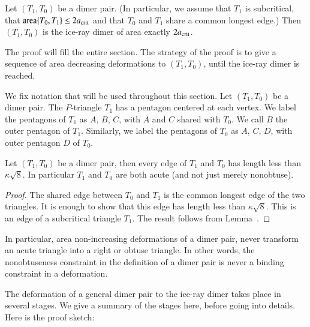 \begin{theorem}
  Let $(T_1,T_0)$ be a dimer pair.  (In particular, we assume that
  $T_1$ is subcritical, that ${\operatorname{area}}\{T_0,T_1\}\le 2a_\text{crit}$ and that
  $T_0$ and $T_1$ share a common longest edge.)  Then $(T_1,T_0)$ is
  the ice-ray dimer of area exactly $2a_\text{crit}$.
\end{theorem}

The proof will fill the entire section.  The strategy of the proof is
to give a sequence of area decreasing deformations to $(T_1,T_0)$,
until the ice-ray dimer is reached.

We fix notation that will be used throughout this section. Let
$(T_1,T_0)$ be a dimer pair.  The $P$-triangle $T_1$ has a pentagon
centered at each vertex.  We label the pentagons of $T_1$ as $A$, $B$,
$C$, with $A$ and $C$ shared with $T_0$.  We call $B$ the outer
pentagon of $T_1$.  Similarly, we label the pentagons of $T_0$ as $A$,
$C$, $D$, with outer pentagon $D$ of $T_0$.


\begin{lemma}  
  Let $(T_1,T_0)$ be a dimer pair, then every edge of $T_1$ and $T_0$
  has length less than $\kappa\sqrt8$.  In particular $T_1$ and $T_0$
  are both acute (and not just merely nonobtuse).
\end{lemma}

\begin{proof}  
  The shared edge between $T_0$ and $T_1$ is the common longest edge
  of the two triangles.  It is enough to show that this edge has
  length less than $\kappa\sqrt8$.  This is an edge of a subcritical
  triangle $T_1$. The result follows from Lemma~.
\end{proof}

In particular, area non-increasing deformations of a dimer pair, never
transform an acute triangle into a right or obtuse triangle.  In other
words, the nonobtuseness constraint in the definition of a dimer pair
is never a binding constraint in a deformation.

The deformation of a general dimer pair to the ice-ray dimer takes
place in several stages.  We give a summary of the stages here, before
going into details.  Here is the proof sketch:

